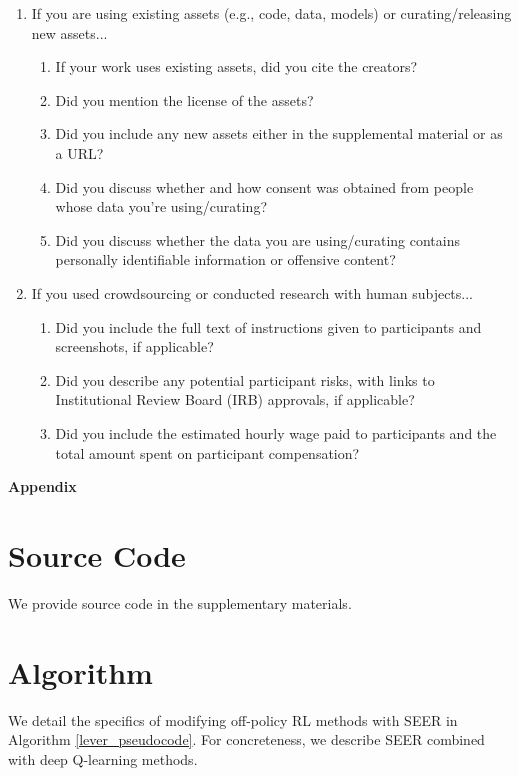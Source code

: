 \documentclass{article}
\begin{document}
\begin{enumerate}
\item If you are using existing assets (e.g., code, data, models) or curating/releasing new assets...
\begin{enumerate}
  \item If your work uses existing assets, did you cite the creators?
    \answerYes{}
  \item Did you mention the license of the assets?
  \item Did you include any new assets either in the supplemental material or as a URL?
    \answerYes{}
  \item Did you discuss whether and how consent was obtained from people whose data you're using/curating?
    \answerNA{}
  \item Did you discuss whether the data you are using/curating contains personally identifiable information or offensive content?
    \answerNA{}
\end{enumerate}

\item If you used crowdsourcing or conducted research with human subjects...
\begin{enumerate}
  \item Did you include the full text of instructions given to participants and screenshots, if applicable?
    \answerNA{}
  \item Did you describe any potential participant risks, with links to Institutional Review Board (IRB) approvals, if applicable?
    \answerNA{}
  \item Did you include the estimated hourly wage paid to participants and the total amount spent on participant compensation?
    \answerNA{}
\end{enumerate}

\end{enumerate}



\newpage
\appendix
\onecolumn

\begin{center}{\bf {\LARGE Appendix}}
\end{center}

\section{Source Code} \label{appendix:source_code}
We provide source code in the supplementary materials.

\section{Algorithm} \label{appendix:pseudocode}
We detail the specifics of modifying off-policy RL methods with SEER in Algorithm \ref{lever_pseudocode}. For concreteness, we describe SEER combined with deep Q-learning methods.
\end{document}
